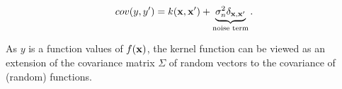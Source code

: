 $$cov(y,y') = k({\mathbf{x}}, {\mathbf{x}}')+\underbrace{\sigma_n^2\delta_{{\mathbf{x}},{\mathbf{x}}'}}_{\textrm{noise term}}.$$

As $y$ is a function values of $f({\mathbf{x}})$, the kernel function can be viewed as an extension of the covariance matrix $\Sigma$ of random vectors to the covariance of (random) functions. 






